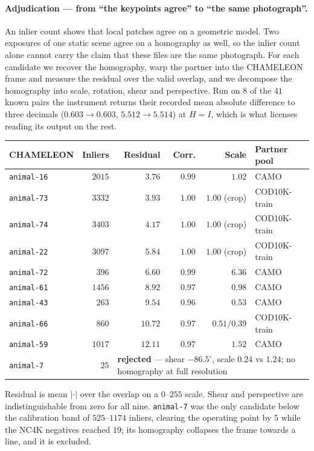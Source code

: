 \documentclass{article} %
\begin{document}
\paragraph{Adjudication --- from ``the keypoints agree'' to ``the same photograph''.} An inlier count
shows that local patches agree on a geometric model. Two exposures of one static scene agree on a
homography as well, so the inlier count alone cannot carry the claim that these files are the same
photograph. For each candidate we recover the homography, warp the partner into the CHAMELEON frame
and measure the residual over the valid overlap, and we decompose the homography into scale,
rotation, shear and perspective. Run on $8$ of the $41$ known pairs the instrument returns their
recorded mean absolute difference to three decimals ($0.603 \to 0.603$, $5.512 \to 5.514$) at
$H = I$, which is what licenses reading its output on the rest.

\begin{center}\small
\begin{tabular}{lrrrrl}
\toprule
CHAMELEON & Inliers & Residual & Corr. & Scale & Partner pool \\
\midrule
\texttt{animal-16} & $2015$ & $3.76$ & $0.99$ & $1.02$ & CAMO \\
\texttt{animal-73} & $3332$ & $3.93$ & $1.00$ & $1.00$ (crop) & COD10K-train \\
\texttt{animal-74} & $3403$ & $4.17$ & $1.00$ & $1.00$ (crop) & COD10K-train \\
\texttt{animal-22} & $3097$ & $5.84$ & $1.00$ & $1.00$ (crop) & COD10K-train \\
\texttt{animal-72} & $396$ & $6.60$ & $0.99$ & $6.36$ & CAMO \\
\texttt{animal-61} & $1456$ & $8.92$ & $0.97$ & $0.98$ & CAMO \\
\texttt{animal-43} & $263$ & $9.54$ & $0.96$ & $0.53$ & CAMO \\
\texttt{animal-66} & $860$ & $10.72$ & $0.97$ & $0.51/0.39$ & COD10K-train \\
\texttt{animal-59} & $1017$ & $12.11$ & $0.97$ & $1.52$ & CAMO \\
\midrule
\texttt{animal-7} & $25$ & \multicolumn{4}{l}{\textbf{rejected} --- shear $-86.5^\circ$, scale $0.24$ vs $1.24$; no homography at full resolution} \\
\bottomrule
\end{tabular}
\end{center}

Residual is mean $|{\cdot}|$ over the overlap on a $0$--$255$ scale. Shear and perspective are
indistinguishable from zero for all nine. \texttt{animal-7} was the only candidate below the
calibration band of $525$--$1174$ inliers, clearing the operating point by $5$ while the NC4K
negatives reached $19$; its homography collapses the frame towards a line, and it is excluded.
\end{document}
